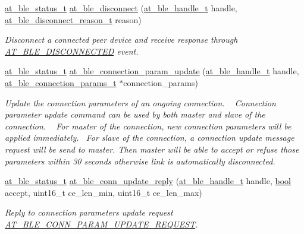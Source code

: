 \begin{DoxyCompactItemize}
\mbox{\hyperlink{group__error__codes__group_ga3b1db9b95feb157b3c188ca27fe76988}{at\+\_\+ble\+\_\+status\+\_\+t}} \mbox{\hyperlink{group__gap__conn__group_gae41a6e7e9c4631e83414e2bdd5089d31}{at\+\_\+ble\+\_\+disconnect}} (\mbox{\hyperlink{at__ble__api_8h_abd23646d0c662860741f787efc8456f2}{at\+\_\+ble\+\_\+handle\+\_\+t}} handle, \mbox{\hyperlink{at__ble__api_8h_a948b817ef7031101d54fdae327ca45ef}{at\+\_\+ble\+\_\+disconnect\+\_\+reason\+\_\+t}} reason)
\begin{DoxyCompactList}\small\item\em Disconnect a connected peer device and receive response through \mbox{\hyperlink{at__ble__api_8h_a3324640b95f33169515f89738ed5baebac472d13b7a89e80f7c5ba3907b761d7a}{A\+T\+\_\+\+B\+L\+E\+\_\+\+D\+I\+S\+C\+O\+N\+N\+E\+C\+T\+ED}} event. \end{DoxyCompactList}\item 
\mbox{\hyperlink{group__error__codes__group_ga3b1db9b95feb157b3c188ca27fe76988}{at\+\_\+ble\+\_\+status\+\_\+t}} \mbox{\hyperlink{group__gap__conn__group_ga9e6ead4f518554d09fee5f458ff7b988}{at\+\_\+ble\+\_\+connection\+\_\+param\+\_\+update}} (\mbox{\hyperlink{at__ble__api_8h_abd23646d0c662860741f787efc8456f2}{at\+\_\+ble\+\_\+handle\+\_\+t}} handle, \mbox{\hyperlink{structat__ble__connection__params__t}{at\+\_\+ble\+\_\+connection\+\_\+params\+\_\+t}} $\ast$connection\+\_\+params)
\begin{DoxyCompactList}\small\item\em Update the connection parameters of an ongoing connection. ~\newline
 Connection parameter update command can be used by both master and slave of the connection. ~\newline
 For master of the connection, new connection parameters will be applied immediately.~\newline
 For slave of the connection, a connection update message request will be send to master. Then master will be able to accept or refuse those parameters within 30 seconds otherwise link is automatically disconnected. \end{DoxyCompactList}\item 
\mbox{\hyperlink{group__error__codes__group_ga3b1db9b95feb157b3c188ca27fe76988}{at\+\_\+ble\+\_\+status\+\_\+t}} \mbox{\hyperlink{group__gap__conn__group_gaf569678c3c460affa1d42d406322aa40}{at\+\_\+ble\+\_\+conn\+\_\+update\+\_\+reply}} (\mbox{\hyperlink{at__ble__api_8h_abd23646d0c662860741f787efc8456f2}{at\+\_\+ble\+\_\+handle\+\_\+t}} handle, \mbox{\hyperlink{group__group__sam0__utils_ga97a80ca1602ebf2303258971a2c938e2}{bool}} accept, uint16\+\_\+t ce\+\_\+len\+\_\+min, uint16\+\_\+t ce\+\_\+len\+\_\+max)
\begin{DoxyCompactList}\small\item\em Reply to connection parameters update request \mbox{\hyperlink{at__ble__api_8h_a3324640b95f33169515f89738ed5baebabcde15cbd78da60babb61d623b0cf2b5}{A\+T\+\_\+\+B\+L\+E\+\_\+\+C\+O\+N\+N\+\_\+\+P\+A\+R\+A\+M\+\_\+\+U\+P\+D\+A\+T\+E\+\_\+\+R\+E\+Q\+U\+E\+ST}}. \end{DoxyCompactList}\end{DoxyCompactItemize}


